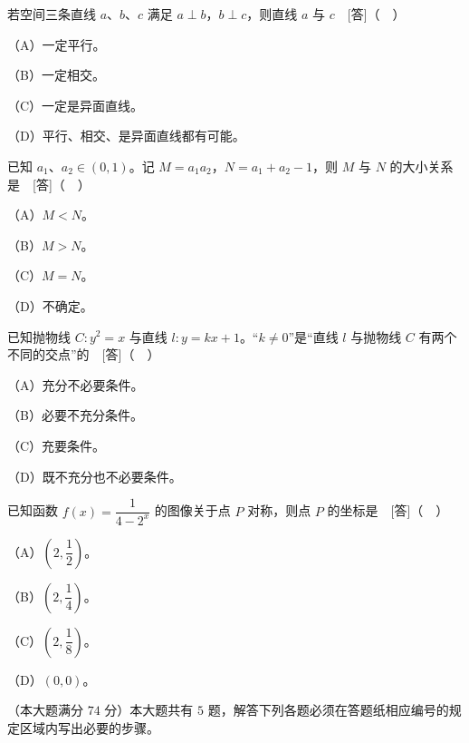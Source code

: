 \begin{question}
若空间三条直线 $a$、$b$、$c$ 满足 $a\perp b$，$b\perp c$，则直线 $a$ 与 $c$　[答]（　）

（A）一定平行。

（B）一定相交。

（C）一定是异面直线。

（D）平行、相交、是异面直线都有可能。

\end{question}
\begin{question}
已知 $a_1$、$a_2\in(0,1)$。记 $M=a_1a_2$，$N=a_1+a_2-1$，则 $M$ 与 $N$ 的大小关系是　[答]（　）

（A）$M<N$。

（B）$M>N$。

（C）$M=N$。

（D）不确定。

\end{question}
\begin{question}
已知抛物线 $C:y^2=x$ 与直线 $l:y=kx+1$。“$k\neq0$”是“直线 $l$ 与抛物线 $C$ 有两个不同的交点”的　[答]（　）

（A）充分不必要条件。

（B）必要不充分条件。

（C）充要条件。

（D）既不充分也不必要条件。

\end{question}
\begin{question}
已知函数 $f(x)=\dfrac{1}{4-2^x}$ 的图像关于点 $P$ 对称，则点 $P$ 的坐标是　[答]（　）

（A）$\left(2,\dfrac12\right)$。

（B）$\left(2,\dfrac14\right)$。

（C）$\left(2,\dfrac18\right)$。

（D）$(0,0)$。

\end{question}

（本大题满分 $74$ 分）本大题共有 $5$ 题，解答下列各题必须在答题纸相应编号的规定区域内写出必要的步骤。

